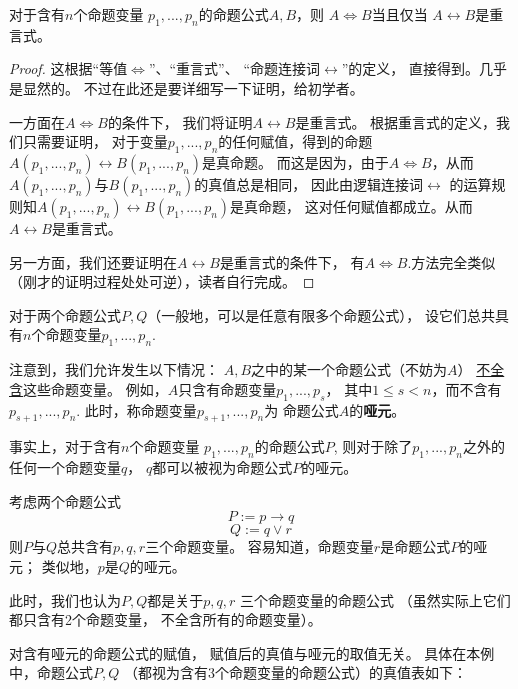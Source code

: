 \begin{thm}对于含有$n$个命题变量
$p_1,...,p_n$的命题公式$A,B$，则
$A\Leftrightarrow B$当且仅当
$A\leftrightarrow B$是重言式。
\end{thm}
\begin{proof}
这根据“等值$\Leftrightarrow$”、“重言式”、
“命题连接词$\leftrightarrow$”的定义，
直接得到。几乎是显然的。
不过在此还是要详细写一下证明，给初学者。

一方面在$A\Leftrightarrow B$的条件下，
我们将证明$A\leftrightarrow B$是重言式。
根据重言式的定义，我们只需要证明，
对于变量$p_1,...,p_n$的任何赋值，得到的命题
$A(p_1,...,p_n)\leftrightarrow B(p_1,...,p_n)$是真命题。
而这是因为，由于$A\Leftrightarrow B$，从而
$A(p_1,...,p_n)$与$B(p_1,...,p_n)$的真值总是相同，
因此由逻辑连接词$\leftrightarrow$
的运算规则知$A(p_1,...,p_n)
\leftrightarrow B(p_1,...,p_n)$是真命题，
这对任何赋值都成立。从而$A\leftrightarrow B$是重言式。

另一方面，我们还要证明在$A\leftrightarrow B$是重言式的条件下，
有$A\Leftrightarrow B$.方法完全类似
（刚才的证明过程处处可逆），读者自行完成。
\end{proof}

\begin{rem}[关于命题公式的命题变量个数]
对于两个命题公式$P,Q$（一般地，可以是任意有限多个命题公式），
设它们总共具有$n$个命题变量$p_1,...,p_n$.

注意到，我们允许发生以下情况：
$A,B$之中的某一个命题公式（不妨为$A$）
\underline{不全含}这些命题变量。
例如，$A$只含有命题变量$p_1,...,p_s$，
其中$1\leq s<n$，而不含有$p_{s+1},...,p_{n}$.
此时，称命题变量$p_{s+1},...,p_{n}$为
命题公式$A$的\textbf{哑元}。
\end{rem}

事实上，对于含有$n$个命题变量
$p_1,...,p_n$的命题公式$P$,
则对于除了$p_1,...,p_n$之外的任何一个命题变量$q$，
$q$都可以被视为命题公式$P$的哑元。

\begin{example}[哑元的简单例子]
考虑两个命题公式
$$P:=p\rightarrow q$$
$$Q:=q\vee r$$
则$P$与$Q$总共含有$p,q,r$三个命题变量。
容易知道，命题变量$r$是命题公式$P$的哑元；
类似地，$p$是$Q$的哑元。
\end{example}

此时，我们也认为$P,Q$都是关于$p,q,r$
三个命题变量的命题公式
（虽然实际上它们都只含有2个命题变量，
不全含所有的命题变量）。

对含有哑元的命题公式的赋值，
赋值后的真值与哑元的取值无关。
具体在本例中，命题公式$P,Q$
（都视为含有3个命题变量的命题公式）的真值表如下：

